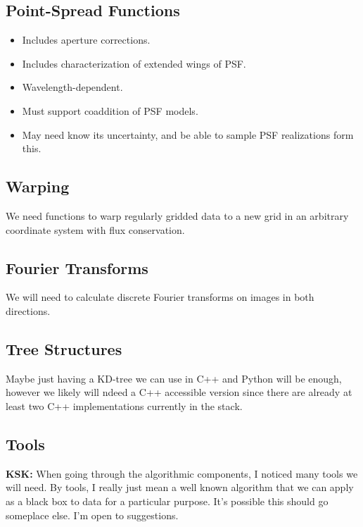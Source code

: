 \subsection{Point-Spread Functions}
\label{sec:spPSF}

\begin{itemize}
\item Includes aperture corrections.
\item Includes characterization of extended wings of PSF.
\item Wavelength-dependent.
\item Must support coaddition of PSF models.
\item May need know its uncertainty, and be able to sample PSF realizations form this.
\end{itemize}

\subsection{Warping}
\label{sec:spWarp}

We need functions to warp regularly gridded data to a new grid in an arbitrary coordinate system with flux conservation.

\subsection{Fourier Transforms}
\label{sec:spFourier}

We will need to calculate discrete Fourier transforms on images in both directions.

\subsection{Tree Structures}
\label{sec:spTrees}
Maybe just having a KD-tree we can use in C++ and Python will be enough, however we likely will ndeed a C++ accessible version since there are already at least two C++ implementations currently in the stack.

\subsection{Tools}
\label{sec:spTools}

\textbf{KSK:} When going through the algorithmic components, I noticed many tools we will need.  By tools, I really just mean a well known algorithm that we can apply as a black box to data for a particular purpose. It's possible this should go someplace else.  I'm open to suggestions.

